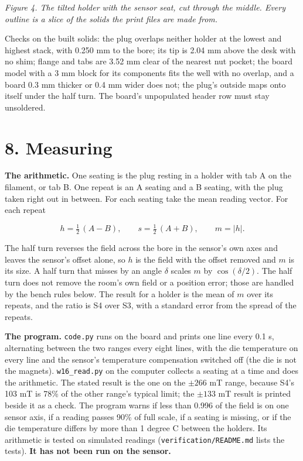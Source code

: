 \documentclass[11pt,a4paper]{article}
\begin{document}
\emph{Figure 4. The tilted holder with the sensor seat, cut through the middle. Every outline is a slice of the solids the print files are made from.}

Checks on the built solids: the plug overlaps neither holder at the lowest and highest stack, with 0.250 mm to the bore; its tip is 2.04 mm above the desk with no shim; flange and tabs are 3.52 mm clear of the nearest nut pocket; the board model with a 3 mm block for its components fits the well with no overlap, and a board 0.3 mm thicker or 0.4 mm wider does not; the plug's outside maps onto itself under the half turn. The board's unpopulated header row must stay unsoldered.


\section*{8. Measuring}
{\bfseries\boldmath The arithmetic.} One seating is the plug resting in a holder with tab A on the filament, or tab B. One repeat is an A seating and a B seating, with the plug taken right out in between. For each seating take the mean reading vector. For each repeat


\begin{equation*}
h=\tfrac12\,(A-B),\qquad s=\tfrac12\,(A+B),\qquad m=\lvert h\rvert .
\end{equation*}


The half turn reverses the field across the bore in the sensor's own axes and leaves the sensor's offset alone, so $h$ is the field with the offset removed and $m$ is its size. A half turn that misses by an angle $\delta$ scales $m$ by $\cos(\delta/2)$. The half turn does not remove the room's own field or a position error; those are handled by the bench rules below. The result for a holder is the mean of $m$ over its repeats, and the ratio is S4 over S3, with a standard error from the spread of the repeats.

{\bfseries\boldmath The program.} \texttt{code.py} runs on the board and prints one line every 0.1 s, alternating between the two ranges every eight lines, with the die temperature on every line and the sensor's temperature compensation switched off (the die is not the magnets). \texttt{w16\_read.py} on the computer collects a seating at a time and does the arithmetic. The stated result is the one on the $\pm 266$ mT range, because S4's 103 mT is 78\% of the other range's typical limit; the $\pm 133$ mT result is printed beside it as a check. The program warns if less than 0.996 of the field is on one sensor axis, if a reading passes 90\% of full scale, if a seating is missing, or if the die temperature differs by more than 1 degree C between the holders. Its arithmetic is tested on simulated readings (\texttt{verification/README.md} lists the tests). {\bfseries\boldmath It has not been run on the sensor.}
\end{document}
